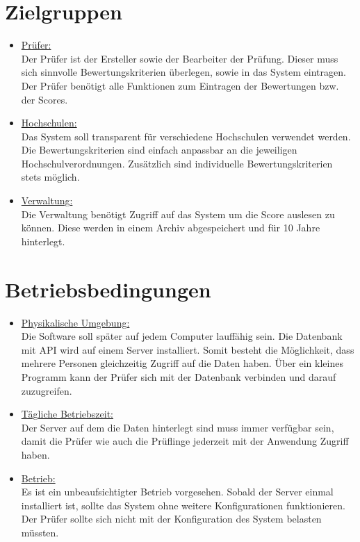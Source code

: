 \documentclass[a4paper,listof=leveldown,listof=numbered]{scrreprt}
\begin{document}
	\section{Zielgruppen}
	\begin{itemize}
		\item \underline{Prüfer:}\\
	Der Prüfer ist der Ersteller sowie der Bearbeiter der Prüfung. Dieser muss sich sinnvolle Bewertungskriterien überlegen, sowie in das System eintragen. Der Prüfer benötigt alle Funktionen zum Eintragen der Bewertungen bzw. der Scores.
	
		\item \underline{Hochschulen:}\\
	Das System soll transparent für verschiedene Hochschulen verwendet werden.  Die Bewertungskriterien sind einfach anpassbar an die jeweiligen Hochschulverordnungen. Zusätzlich sind individuelle Bewertungskriterien stets möglich.
			
		\item \underline{Verwaltung:}\\
	Die Verwaltung benötigt Zugriff auf das System um die Score auslesen zu können. Diese werden in einem Archiv abgespeichert und für 10 Jahre hinterlegt. 	
		
	\end{itemize}

	\section{Betriebsbedingungen}
	
	\begin{itemize}
	\item \underline{Physikalische Umgebung:}\\
	Die Software soll später auf jedem Computer lauffähig sein. Die Datenbank mit API wird auf einem Server installiert. Somit besteht die Möglichkeit, dass mehrere Personen gleichzeitig Zugriff auf die Daten haben. Über ein kleines Programm kann der Prüfer sich mit der Datenbank verbinden und darauf zuzugreifen.
	
	\item \underline{Tägliche Betriebszeit:} \\
	Der Server auf dem die Daten hinterlegt sind muss immer verfügbar sein, damit die Prüfer wie auch die Prüflinge jederzeit mit der Anwendung Zugriff haben.
		
	\item \underline{Betrieb:} \\
	Es ist ein unbeaufsichtigter Betrieb vorgesehen. Sobald der Server einmal installiert ist, sollte das System ohne weitere Konfigurationen funktionieren. Der Prüfer sollte sich nicht mit der Konfiguration des System belasten müssten. 	
	\end{itemize}
	
\end{document}
